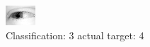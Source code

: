 \begin{figure}[h!]
\begin{center}
\includegraphics[width=0.60\columnwidth]{figures/ID2454_class_3_target_4.png}
\end{center}
\caption{ Classification: 3 actual target: 4}
\label{fig:ID2454_class_3_target_4}
\end{figure}
